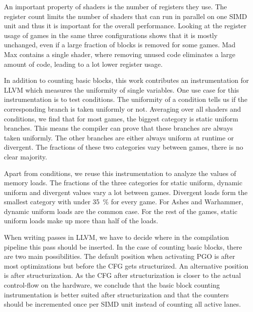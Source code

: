 An important property of shaders is the number of registers they use.
The register count limits the number of shaders that can run in parallel on one SIMD unit and thus it is important for the overall performance.
Looking at the register usage of games in the same three configurations shows that it is mostly unchanged, even if a large fraction of blocks is removed for some games.
Mad Max contains a single shader, where removing unused code eliminates a large amount of code, leading to a lot lower register usage.

In addition to counting basic blocks, this work contributes an instrumentation for LLVM which measures the uniformity of single variables.
One use case for this instrumentation is to test conditions.
The uniformity of a condition tells us if the corresponding branch is taken uniformly or not.
Averaging over all shaders and conditions, we find that for most games, the biggest category is static uniform branches.
This means the compiler can prove that these branches are always taken uniformly.
The other branches are either always uniform at runtime or divergent.
The fractions of these two categories vary between games, there is no clear majority.

Apart from conditions, we reuse this instrumentation to analyze the values of memory loads.
The fractions of the three categories for static uniform, dynamic uniform and divergent values vary a lot between games.
Divergent loads form the smallest category with under \SI{35}{\percent} for every game.
For Ashes and Warhammer, dynamic uniform loads are the common case.
For the rest of the games, static uniform loads make up more than half of the loads.

When writing passes in LLVM, we have to decide where in the compilation pipeline this pass should be inserted.
In the case of counting basic blocks, there are two main possibilities.
The default position when activating PGO is after most optimizations but before the CFG gets structurized.
An alternative position is after structurization.
As the CFG after structurization is closer to the actual control-flow on the hardware, we conclude that the basic block counting instrumentation is better suited after structurization and that the counters should be incremented once per SIMD unit instead of counting all active lanes.
